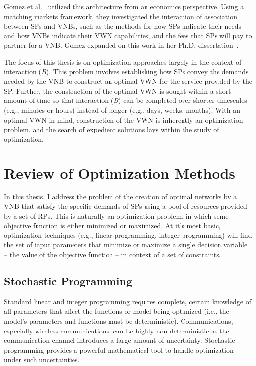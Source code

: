 \documentclass[12pt,dvipsnames]{report}
\begin{document}
Gomez et al.~\cite{pittir33631} utilized this architecture from an economics perspective.  Using a matching markets framework, they investigated the interaction of association between SPs and VNBs, such as the methods for how SPs indicate their needs and how VNBs indicate their VWN capabilities, and the fees that SPs will pay to partner for a VNB.  Gomez expanded on this work in her Ph.D. dissertation~\cite{pittir33130}.%

The focus of this thesis is on optimization approaches largely in the context of interaction (\emph{B}).  This problem involves establishing how SPs convey the demands needed by the VNB to construct an optimal VWN for the service provided by the SP.  Further, the construction of the optimal VWN is sought within a short amount of time so that interaction (\emph{B}) can be completed over shorter timescales (e.g., minutes or hours) instead of longer (e.g., days, weeks, months).  With an optimal VWN in mind, construction of the VWN is inherently an optimization problem, and the search of expedient solutions lays within the study of optimization.

\section{Review of Optimization Methods} \label{sec:optreview}

In this thesis, I address the problem of the creation of optimal networks by a VNB that satisfy the specific demands of SPs using a pool of resources provided by a set of RPs.  This is naturally an optimization problem, in which some objective function is either minimized or maximized.  At it's most basic, optimization techniques (e.g., linear programming, integer programming) will find the set of input parameters that minimize or maximize a single decision variable -- the value of the objective function -- in context of a set of constraints.

\subsection{Stochastic Programming}	\label{subsec:optreview_stoch}

Standard linear and integer programming requires complete, certain knowledge of all parameters that affect the functions or model being optimized (i.e., the model's parameters and functions must be deterministic).  Communications, especially wireless communications, can be highly non-deterministic as the communication channel introduces a large amount of uncertainty.  Stochastic programming provides a powerful mathematical tool to handle optimization under such uncertainties.
\end{document}
